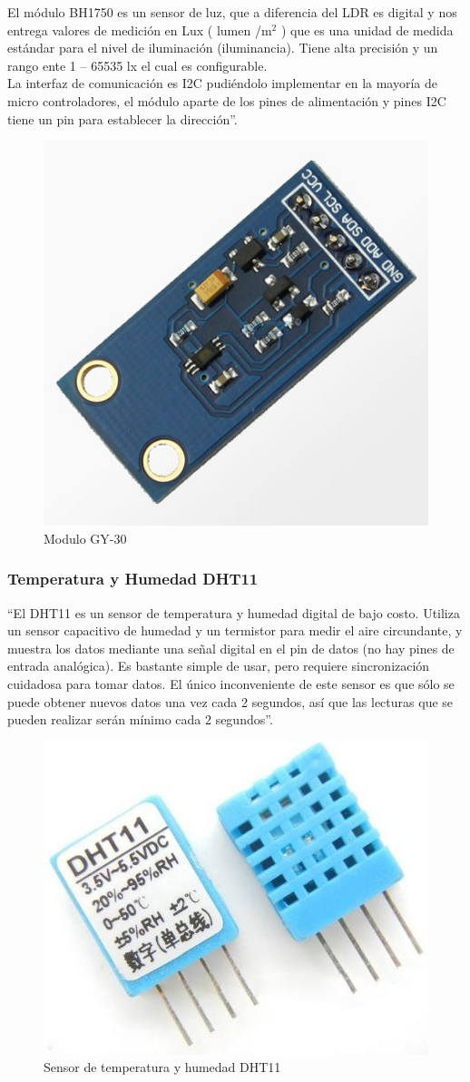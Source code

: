 El módulo BH1750 es un sensor de luz, que a diferencia del LDR es digital y nos entrega valores de medición en Lux ( lumen /m$^2$ ) que es una  unidad de medida estándar para el nivel de iluminación (iluminancia). Tiene alta precisión y un rango ente 1 – 65535 lx el cual es configurable.\\

La interfaz de comunicación es I2C pudiéndolo implementar en la mayoría de micro controladores, el módulo aparte de los pines de alimentación y pines I2C tiene un pin para establecer la dirección''.\cite{GY30}

\begin{figure}[H]
	\centering
	\caption{Modulo GY-30 \cite{GY30}}
	\label{fig:gy-30}
	\includegraphics[width=0.4\linewidth]{Imagenes/gy-30}
\end{figure}

\subsubsection{Temperatura y Humedad DHT11}

``El DHT11 es un sensor de temperatura y humedad digital de bajo costo. Utiliza un sensor capacitivo de humedad y un termistor para medir el aire circundante, y muestra los datos mediante una señal digital en el pin de datos (no hay pines de entrada analógica). Es bastante simple de usar, pero requiere sincronización cuidadosa para tomar datos. El único inconveniente de este sensor es que sólo se puede obtener nuevos datos una vez cada 2 segundos, así que las lecturas que se pueden realizar serán mínimo cada 2 segundos''. \cite{DHT11}

\begin{figure}[H]
	\centering
	\caption{Sensor de temperatura y humedad DHT11 \cite{DHT11}}
	\label{fig:dht11}
	\includegraphics[width=0.4\linewidth]{Imagenes/dht11}
\end{figure}


